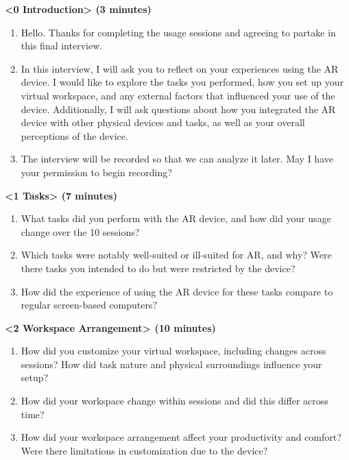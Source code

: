 \textbf{<0 Introduction> (3 minutes)}
\begin{enumerate}[label=(\arabic*)]
\item Hello. Thanks for completing the usage sessions and agreeing to partake in this final interview. 
\item In this interview, I will ask you to reflect on your experiences using the AR device. I would like to explore the tasks you performed, how you set up your virtual workspace, and any external factors that influenced your use of the device. Additionally, I will ask questions about how you integrated the AR device with other physical devices and tasks, as well as your overall perceptions of the device.

\item The interview will be recorded so that we can analyze it later. May I have your permission to begin recording?
\end{enumerate}

\textbf{<1 Tasks> (7 minutes)}

\begin{enumerate}[label=(\arabic*)]
\item 
What tasks did you perform with the AR device, and how did your usage change over the 10 sessions?

\item
Which tasks were notably well-suited or ill-suited for AR, and why? Were there tasks you intended to do but were restricted by the device?

\item
How did the experience of using the AR device for these tasks compare to regular screen-based computers?
\end{enumerate}

\textbf{<2 Workspace Arrangement> (10 minutes)}

\begin{enumerate}[label=(\arabic*)]
\item 
How did you customize your virtual workspace, including changes across sessions? How did task nature and physical surroundings influence your setup?

\item 
How did your workspace change within sessions and did this differ across time? 

\item 
How did your workspace arrangement affect your productivity and comfort? Were there limitations in customization due to the device?
\end{enumerate}

